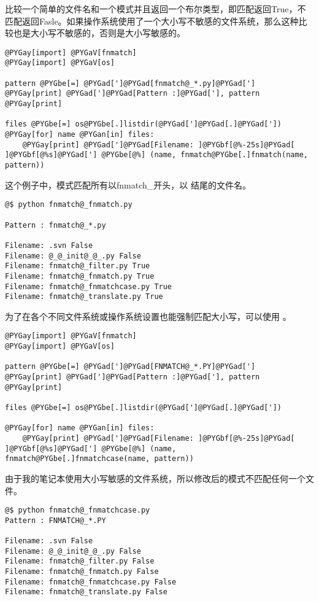 \documentclass[a4paper,10pt,english]{manual}
\begin{document}
 比较一个简单的文件名和一个模式并且返回一个布尔类型，即匹配返回True，不匹配返回Fasle。如果操作系统使用了一个大小写不敏感的文件系统，那么这种比较也是大小写不敏感的，否则是大小写敏感的。

\begin{Verbatim}[commandchars=@\[\]]
@PYGay[import] @PYGaV[fnmatch]
@PYGay[import] @PYGaV[os]

pattern @PYGbe[=] @PYGad[']@PYGad[fnmatch@_*.py]@PYGad[']
@PYGay[print] @PYGad[']@PYGad[Pattern :]@PYGad['], pattern
@PYGay[print]

files @PYGbe[=] os@PYGbe[.]listdir(@PYGad[']@PYGad[.]@PYGad['])
@PYGay[for] name @PYGan[in] files:
    @PYGay[print] @PYGad[']@PYGad[Filename: ]@PYGbf[@%-25s]@PYGad[ ]@PYGbf[@%s]@PYGad['] @PYGbe[@%] (name, fnmatch@PYGbe[.]fnmatch(name, pattern))
\end{Verbatim}

这个例子中，模式匹配所有以fnmatch\_开头，以  结尾的文件名。

\begin{Verbatim}[commandchars=@\[\]]
@$ python fnmatch@_fnmatch.py

Pattern : fnmatch@_*.py

Filename: .svn False
Filename: @_@_init@_@_.py False
Filename: fnmatch@_filter.py True
Filename: fnmatch@_fnmatch.py True
Filename: fnmatch@_fnmatchcase.py True
Filename: fnmatch@_translate.py True
\end{Verbatim}

为了在各个不同文件系统或操作系统设置也能强制匹配大小写，可以使用  。

\begin{Verbatim}[commandchars=@\[\]]
@PYGay[import] @PYGaV[fnmatch]
@PYGay[import] @PYGaV[os]

pattern @PYGbe[=] @PYGad[']@PYGad[FNMATCH@_*.PY]@PYGad[']
@PYGay[print] @PYGad[']@PYGad[Pattern :]@PYGad['], pattern
@PYGay[print]

files @PYGbe[=] os@PYGbe[.]listdir(@PYGad[']@PYGad[.]@PYGad['])

@PYGay[for] name @PYGan[in] files:
    @PYGay[print] @PYGad[']@PYGad[Filename: ]@PYGbf[@%-25s]@PYGad[ ]@PYGbf[@%s]@PYGad['] @PYGbe[@%] (name, fnmatch@PYGbe[.]fnmatchcase(name, pattern))
\end{Verbatim}

由于我的笔记本使用大小写敏感的文件系统，所以修改后的模式不匹配任何一个文件。

\begin{Verbatim}[commandchars=@\[\]]
@$ python fnmatch@_fnmatchcase.py
Pattern : FNMATCH@_*.PY

Filename: .svn False
Filename: @_@_init@_@_.py False
Filename: fnmatch@_filter.py False
Filename: fnmatch@_fnmatch.py False
Filename: fnmatch@_fnmatchcase.py False
Filename: fnmatch@_translate.py False
\end{Verbatim}
\end{document}
